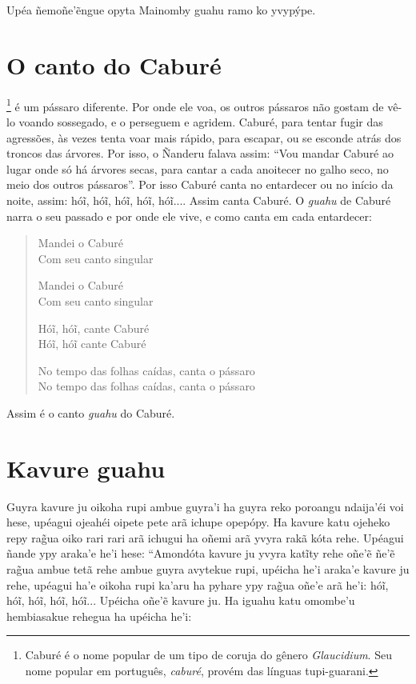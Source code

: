 
Upéa ñemoñe'ẽngue opyta Mainomby guahu ramo ko yvypýpe.


\chapter{O canto do Caburé}

\footnote{Caburé é o nome popular de um tipo de coruja do gênero
  \emph{Glaucidium}. Seu nome popular em português, \emph{caburé},
  provém das línguas tupi-guarani.} é um pássaro diferente. Por onde ele
voa, os outros pássaros não gostam de vê-lo voando sossegado, e o
perseguem e agridem. Caburé, para tentar fugir das agressões, às vezes
tenta voar mais rápido, para escapar, ou se esconde atrás dos troncos
das árvores. Por isso, o Ñanderu falava assim: ``Vou mandar Caburé ao
lugar onde só há árvores secas, para cantar a cada anoitecer no galho
seco, no meio dos outros pássaros''. Por isso Caburé canta no entardecer
ou no início da noite, assim: hóĩ, hóĩ, hóĩ, hóĩ, hóĩ.... Assim canta
Caburé. O \emph{guahu} de Caburé narra o seu passado e por onde ele
vive, e como canta em cada entardecer:

\begin{verse}
Mandei o Caburé\\
Com seu canto singular

Mandei o Caburé\\
Com seu canto singular

Hóĩ, hóĩ, cante Caburé\\
Hóĩ, hóĩ cante Caburé

No tempo das folhas caídas, canta o pássaro\\
No tempo das folhas caídas, canta o pássaro
\end{verse}

Assim é o canto \emph{guahu} do Caburé.

\chapter{Kavure guahu}

Guyra kavure ju oikoha rupi ambue guyra'i ha guyra reko poroangu
ndaija'éi voi hese, upéagui ojeahéi oipete pete arã ichupe opepópy. Ha
kavure katu ojeheko repy rag̃ua oiko rari rari arã ichugui ha oñemi arã
yvyra rakã kóta rehe. Upéagui ñande ypy araka'e he'i hese: ``Amondóta
kavure ju yvyra katĩty rehe oñe'ẽ ñe'ẽ rag̃ua ambue tetã rehe ambue guyra
avytekue rupi, upéicha he'i araka'e kavure ju rehe, upéagui ha'e oikoha
rupi ka'aru ha pyhare ypy rag̃ua oñe'e arã he'i: hóĩ, hóĩ, hóĩ, hóĩ,
hóĩ... Upéicha oñe'ẽ kavure ju. Ha iguahu katu omombe'u hembiasakue
rehegua ha upéicha he'i:

